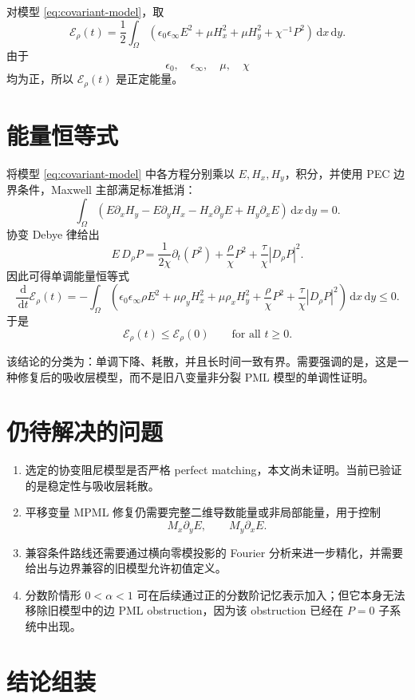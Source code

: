 \documentclass[UTF8,a4paper,12pt]{ctexart}
\newcommand{\dd}{\,\mathrm{d}}
\newcommand{\Ecal}{\mathcal E}
\begin{document}
对模型 \eqref{eq:covariant-model}，取
\[
\boxed{
\Ecal_\rho(t)=\frac12\int_\Omega
\left(
\epsilon_0\epsilon_\infty E^2+\mu H_x^2+\mu H_y^2+\chi^{-1}P^2
\right)\dd x\dd y .}
\]
由于
\[
\epsilon_0,\quad \epsilon_\infty,\quad \mu,\quad \chi
\]
均为正，所以 \(\Ecal_\rho(t)\) 是正定能量。

\section{能量恒等式}

将模型 \eqref{eq:covariant-model} 中各方程分别乘以 \(E,H_x,H_y\)，积分，并使用 PEC 边界条件，Maxwell 主部满足标准抵消：
\[
\int_\Omega
\left(
E\partial_xH_y-E\partial_yH_x-H_x\partial_yE+H_y\partial_xE
\right)\dd x\dd y=0 .
\]
协变 Debye 律给出
\[
E\,D_\rho P
=\frac{1}{2\chi}\partial_t(P^2)
+\frac{\rho}{\chi}P^2
+\frac{\tau}{\chi}|D_\rho P|^2 .
\]
因此可得单调能量恒等式
\[
\boxed{
\frac{\dd}{\dd t}\Ecal_\rho(t)
=-\int_\Omega
\left(
\epsilon_0\epsilon_\infty\rho E^2
+\mu\rho_yH_x^2
+\mu\rho_xH_y^2
+\frac{\rho}{\chi}P^2
+\frac{\tau}{\chi}|D_\rho P|^2
\right)\dd x\dd y\le0 .}
\]
于是
\[
\boxed{
\Ecal_\rho(t)\le \Ecal_\rho(0)\qquad\text{for all }t\ge0 .
}
\]

该结论的分类为：单调下降、耗散，并且长时间一致有界。需要强调的是，这是一种修复后的吸收层模型，而不是旧八变量非分裂 PML 模型的单调性证明。

\section{仍待解决的问题}

\begin{enumerate}
\item 选定的协变阻尼模型是否严格 perfect matching，本文尚未证明。当前已验证的是稳定性与吸收层耗散。
\item 平移变量 MPML 修复仍需要完整二维导数能量或非局部能量，用于控制
\[
M_x\partial_yE,\qquad M_y\partial_xE .
\]
\item 兼容条件路线还需要通过横向零模投影的 Fourier 分析来进一步精化，并需要给出与边界兼容的旧模型允许初值定义。
\item 分数阶情形 \(0<\alpha<1\) 可在后续通过正的分数阶记忆表示加入；但它本身无法移除旧模型中的边 PML obstruction，因为该 obstruction 已经在 \(P=0\) 子系统中出现。
\end{enumerate}

\section{结论组装}
\end{document}
